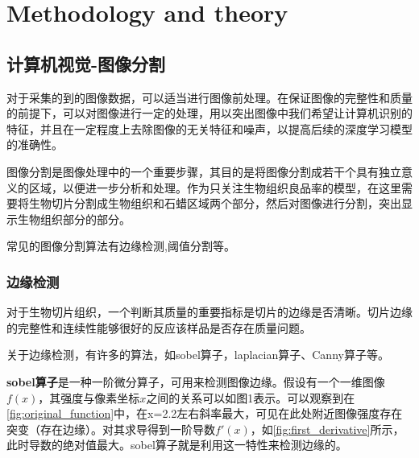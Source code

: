 \section{Methodology and theory}
\label{sec:problem_description}

\subsection{计算机视觉-图像分割}

对于采集的到的图像数据，可以适当进行图像前处理。在保证图像的完整性和质量的前提下，可以对图像进行一定的处理，用以突出图像中我们希望让计算机识别的特征，并且在一定程度上去除图像的无关特征和噪声，以提高后续的深度学习模型的准确性。

图像分割是图像处理中的一个重要步骤，其目的是将图像分割成若干个具有独立意义的区域，以便进一步分析和处理。作为只关注生物组织良品率的模型，在这里需要将生物切片分割成生物组织和石蜡区域两个部分，然后对图像进行分割，突出显示生物组织部分的部分。

常见的图像分割算法有边缘检测,阈值分割等。

\subsubsection{边缘检测}
对于生物切片组织，一个判断其质量的重要指标是切片的边缘是否清晰。切片边缘的完整性和连续性能够很好的反应该样品是否存在质量问题。

关于边缘检测，有许多的算法，如sobel算子，laplacian算子、Canny算子等。\cite{3.1}

\textbf{sobel算子}是一种一阶微分算子，可用来检测图像边缘\cite{补充1}。假设有一个一维图像$f(x)$，其强度与像素坐标$x$之间的关系可以如图1表示。可以观察到在\autoref{fig:original_function}中，在x=2.2左右斜率最大，可见在此处附近图像强度存在突变（存在边缘）。对其求导得到一阶导数$f'(x)$，如\autoref{fig:first_derivative}所示，此时导数的绝对值最大。sobel算子就是利用这一特性来检测边缘的。

